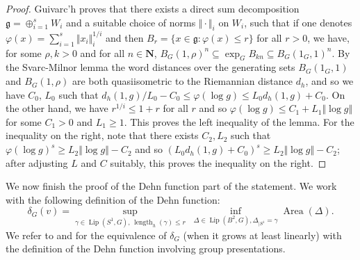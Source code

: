 \documentclass[12pt]{amsart}
\theoremstyle{definition}
\begin{document}
\begin{proof}
    Guivarc'h \cite[p.344]{GuivNil} proves that there exists a direct sum decomposition $\mathfrak g  = \oplus_{i=1}^s W_i$ and a suitable choice of  norms $\Vert \cdot \Vert_i$ on $W_i$, such that if one denotes $\varphi(x) = \sum_{i=1}^s \Vert x_i \Vert_i^{1/i}$ and then $B_r = \{ x \in \mathfrak g : \varphi(x) \leqslant r \}$ for all $r >0$, we have, for some $\rho, k >0$ and for all $n \in \mathbf N$,
    $B_G(1,\rho)^n \subseteq \exp_G B_{kn} \subseteq B_G(1_G,1)^n $. By the Svarc-Milnor lemma the word distances over the generating sets $B_G(1_G, 1)$ and $B_G(1,\rho)$ are both quasiisometric to the Riemannian distance $d_h$, and so we have $C_0$, $L_0$ such that $d_h(1,g)/L_0 - C_0 \leqslant \varphi(\log g) \leqslant L_0 d_h(1,g) + C_0$.
    On the other hand, we have $r^{1/i} \leqslant 1 + r$ for all $r$ and so
    $\varphi(\log g) \leqslant C_1 + L_1 \Vert \log g \Vert$ for some $C_1 > 0$ and $L_1 \geqslant 1$. This proves the left inequality of the lemma. For the inequality on the right, note that there exists $C_2, L_2$ such that $\varphi(\log g)^{s} \geqslant L_2 \Vert \log g \Vert- C_2$ and so $(L_0 d_h(1,g) + C_0)^s \geqslant L_2 \Vert \log g \Vert - C_2$; after adjusting $L$ and $C$ suitably, this proves the inequality on the right.
\end{proof}

We now finish the proof of the Dehn function part of the statement. We work with the following definition of the Dehn function: 
\[ \delta_G(v) = \sup_{\gamma \in \operatorname{Lip}(S^1,G), \,\operatorname{length}_h(\gamma) \leqslant r} \; \inf_{\Delta \in \operatorname{Lip}(B^2, G), \Delta_{\mid S^1} = \gamma} \operatorname{Area}(\Delta).  \]
We refer to \cite[2.C.1]{CTD} and \cite[Section 5]{MR1967746} for the equivalence of $\delta_G$ (when it grows at least linearly) with the definition of the Dehn function involving group presentations. 
\end{document}
